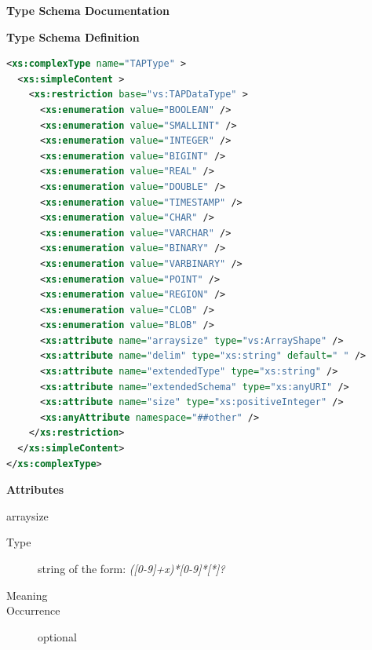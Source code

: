 \documentclass[11pt,a4paper]{ivoa}
\begin{document}
\begin{generated}
\begingroup
      	\renewcommand*\descriptionlabel[1]{%
      	\hbox to 5.5em{\emph{#1}\hfil}}\vspace{2ex}\noindent\textbf{ Type Schema Documentation}


\vspace{1ex}\noindent\textbf{ Type Schema Definition}

\begin{lstlisting}[language=XML,basicstyle=\footnotesize]
<xs:complexType name="TAPType" >
  <xs:simpleContent >
    <xs:restriction base="vs:TAPDataType" >
      <xs:enumeration value="BOOLEAN" />
      <xs:enumeration value="SMALLINT" />
      <xs:enumeration value="INTEGER" />
      <xs:enumeration value="BIGINT" />
      <xs:enumeration value="REAL" />
      <xs:enumeration value="DOUBLE" />
      <xs:enumeration value="TIMESTAMP" />
      <xs:enumeration value="CHAR" />
      <xs:enumeration value="VARCHAR" />
      <xs:enumeration value="BINARY" />
      <xs:enumeration value="VARBINARY" />
      <xs:enumeration value="POINT" />
      <xs:enumeration value="REGION" />
      <xs:enumeration value="CLOB" />
      <xs:enumeration value="BLOB" />
      <xs:attribute name="arraysize" type="vs:ArrayShape" />
      <xs:attribute name="delim" type="xs:string" default=" " />
      <xs:attribute name="extendedType" type="xs:string" />
      <xs:attribute name="extendedSchema" type="xs:anyURI" />
      <xs:attribute name="size" type="xs:positiveInteger" />
      <xs:anyAttribute namespace="##other" />
    </xs:restriction>
  </xs:simpleContent>
</xs:complexType>
\end{lstlisting}

\vspace{0.5ex}\noindent\textbf{ Attributes}

\begingroup\small\begin{bigdescription}
\item[arraysize]
\begin{description}
\item[Type] string of the form: \emph{([0-9]+x)*[0-9]*[*]?}
\item[Meaning] 
\item[Occurrence] optional


\end{description}
\end{bigdescription}
\end{generated}
\end{document}
